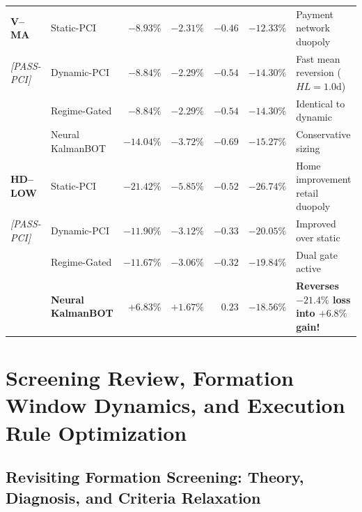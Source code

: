 \documentclass[11pt, a4paper]{article}
\begin{document}
\begin{center}
\begin{longtable}{llrrrrp{4.8cm}}
\midrule
\textbf{V--MA} & Static-PCI & $-8.93\%$ & $-2.31\%$ & $-0.46$ & $-12.33\%$ & Payment network duopoly \\
\small\textit{[PASS-PCI]} & Dynamic-PCI & $-8.84\%$ & $-2.29\%$ & $-0.54$ & $-14.30\%$ & Fast mean reversion ($HL=1.0\text{d}$) \\
 & Regime-Gated & $-8.84\%$ & $-2.29\%$ & $-0.54$ & $-14.30\%$ & Identical to dynamic \\
 & Neural KalmanBOT & $-14.04\%$ & $-3.72\%$ & $-0.69$ & $-15.27\%$ & Conservative sizing \\
\midrule
\textbf{HD--LOW} & Static-PCI & $-21.42\%$ & $-5.85\%$ & $-0.52$ & $-26.74\%$ & Home improvement retail duopoly \\
\small\textit{[PASS-PCI]} & Dynamic-PCI & $-11.90\%$ & $-3.12\%$ & $-0.33$ & $-20.05\%$ & Improved over static \\
 & Regime-Gated & $-11.67\%$ & $-3.06\%$ & $-0.32$ & $-19.84\%$ & Dual gate active \\
 & \textbf{Neural KalmanBOT} & $\mathbf{+6.83\%}$ & $\mathbf{+1.67\%}$ & $\mathbf{0.23}$ & $\mathbf{-18.56\%}$ & \textbf{Reverses $-21.4\%$ loss into $+6.8\%$ gain!} \\
\end{longtable}
\end{center}

\section{Screening Review, Formation Window Dynamics, and Execution Rule Optimization}

\subsection{Revisiting Formation Screening: Theory, Diagnosis, and Criteria Relaxation}
\label{sec:screening_review}
\end{document}
